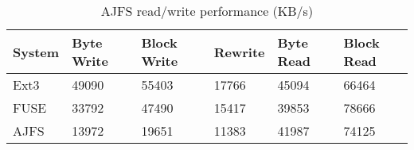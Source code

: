 \begin{table}[Ht]
\caption{AJFS read/write performance (KB/s)}
\centering
\begin{tabular}{|p{0.9cm}|p{0.9cm}|p{0.9cm}|p{0.9cm}|p{0.9cm}|p{0.9cm}|}
\hline\hline
System & Byte Write & Block Write & Rewrite & Byte Read & Block Read \\
\hline
Ext3	& 49090	& 55403	& 17766	& 45094	& 66464	\\
\hline
FUSE	& 33792	& 47490	& 15417	& 39853	& 78666	\\
\hline
AJFS	& 13972	& 19651	& 11383	& 41987	& 74125	\\
\hline
\end{tabular}
\label{table:performance}
\end{table}

